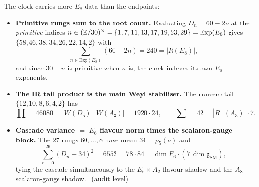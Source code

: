 \begin{winbox}
The clock carries more $E_8$ data than the endpoints:
\begin{itemize}\setlength\itemsep{3pt}
\item\textbf{Primitive rungs sum to the root count.} Evaluating $D_n=60-2n$ at the \emph{primitive}
indices $n\in(\mathbb{Z}/30)^\times=\{1,7,11,13,17,19,23,29\}=\mathrm{Exp}(E_8)$ gives
$\{58,46,38,34,26,22,14,2\}$ with
\[
  \sum_{n\in\mathrm{Exp}(E_8)}(60-2n)=240=|R(E_8)| ,
\]
and since $30-n$ is primitive when $n$ is, the clock indexes its own $E_8$ exponents.
\item\textbf{The IR tail product is the main Weyl stabiliser.} The nonzero tail
$\{12,10,8,6,4,2\}$ has
\[
  \prod=46080=|W(D_5)|\,|W(A_3)|=1920\cdot24,\qquad \textstyle\sum=42=|R^+(A_3)|\cdot7 .
\]
\item\textbf{Cascade variance $=$ $E_6$ flavour norm times the scalaron-gauge block.} The $27$ rungs
$60,\dots,8$ have mean $34=p_5(a)$ and
\[
  \sum_{n=0}^{26}(D_n-34)^2=6552=78\cdot84=\dim E_6\cdot(7\,\dim\mathfrak g_{\mathrm{SM}}) ,
\]
tying the cascade simultaneously to the $E_6{\times}A_2$ flavour shadow and the $A_8$ scalaron-gauge
shadow. \mE\ (audit level)
\end{itemize}
\end{winbox}

